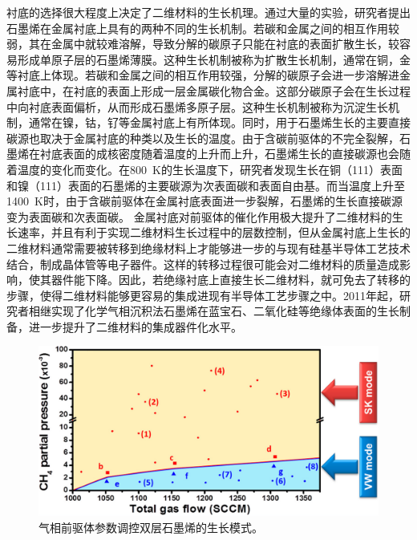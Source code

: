     衬底的选择很大程度上决定了二维材料的生长机理。通过大量的实验，研究者提出石墨烯在金属衬底上具有的两种不同的生长机制。若碳和金属之间的相互作用较弱，其在金属中就较难溶解，导致分解的碳原子只能在衬底的表面扩散生长，较容易形成单原子层的石墨烯薄膜。这种生长机制被称为扩散生长机制，通常在铜，金等衬底上体现。若碳和金属之间的相互作用较强，分解的碳原子会进一步溶解进金属衬底中，在衬底的表面上形成一层金属碳化物合金。这部分碳原子会在生长过程中向衬底表面偏析，从而形成石墨烯多原子层。这种生长机制被称为沉淀生长机制，通常在镍，钴，钌等金属衬底上有所体现。同时，用于石墨烯生长的主要直接碳源也取决于金属衬底的种类以及生长的温度。由于含碳前驱体的不完全裂解，石墨烯在衬底表面的成核密度随着温度的上升而上升，石墨烯生长的直接碳源也会随着温度的变化而变化。在\SI{800}{\kelvin}的生长温度下，研究者发现生长在铜（111）表面和镍（111）表面的石墨烯的主要碳源为次表面碳和表面自由基。而当温度上升至\SI{1400}{\kelvin}时，由于含碳前驱体在金属衬底表面进一步裂解，石墨烯的生长直接碳源变为表面碳和次表面碳。
    金属衬底对前驱体的催化作用极大提升了二维材料的生长速率，并且有利于实现二维材料生长过程中的层数控制，但从金属衬底上生长的二维材料通常需要被转移到绝缘材料上才能够进一步的与现有硅基半导体工艺技术结合，制成晶体管等电子器件。这样的转移过程很可能会对二维材料的质量造成影响，使其器件能下降。因此，若绝缘衬底上直接生长二维材料，就可免去了转移的步骤，使得二维材料能够更容易的集成进现有半导体工艺步骤之中。2011年起，研究者相继实现了化学气相沉积法石墨烯在蓝宝石、二氧化硅等绝缘体表面的生长制备，进一步提升了二维材料的集成器件化水平。

    \begin{figure}[htb]
        \includegraphics{pic/INTRO_growth_grapheneGasModeSwitchn.png}    
        \caption{气相前驱体参数调控双层石墨烯的生长模式。}
    \end{figure}

